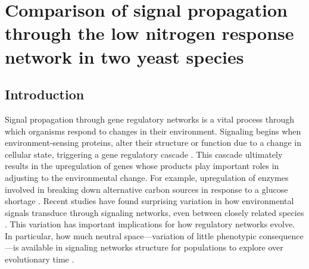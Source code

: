 \chapter{Comparison of signal propagation through the low nitrogen response network in two yeast species}
\label{chpt:networks}

\section{Introduction}

Signal propagation through gene regulatory networks is a vital process through which organisms respond to changes in their environment. Signaling begins when environment-sensing proteins, alter their structure or function due to a change in cellular state, triggering a gene regulatory cascade \cite{Bahn2007}. This cascade ultimately results in the upregulation of genes whose products play important roles in adjusting to the environmental change. For example, upregulation of enzymes involved in breaking down alternative carbon sources in response to a glucose shortage \cite{Gancedo1998}. Recent studies have found surprising variation in how environmental signals transduce through signaling networks, even between closely related species \cite{Britton2020}. This variation has important implications for how regulatory networks evolve. In particular, how much neutral space---variation of little phenotypic consequence---is available in signaling networks structure for populations to explore over evolutionary time \cite{Payne2015}.

